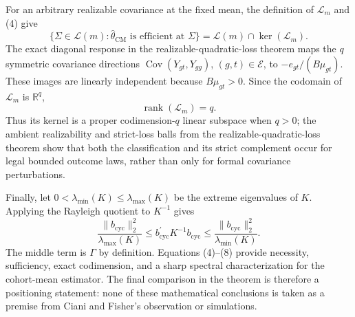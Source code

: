 For an arbitrary realizable covariance at the fixed mean, the definition of \(\mathcal L_m\) and (4) give
\[
\{\Sigma\in\mathcal L(m):\widehat\theta_{\mathrm{CM}}
\text{ is efficient at }\Sigma\}
=\mathcal L(m)\cap\ker(\mathcal L_m).                 \tag{6}
\]
The exact diagonal response in the realizable-quadratic-loss theorem maps the \(q\) symmetric covariance directions
\(\operatorname{Cov}(Y_{gt},Y_{gg})\), \((g,t)\in\mathcal E\), to
\(-e_{gt}/(B\mu_{gt})\).  These images are linearly independent because \(B\mu_{gt}>0\).  Since the codomain of \(\mathcal L_m\) is \(\mathbb R^q\),
\[
\operatorname{rank}(\mathcal L_m)=q.                  \tag{7}
\]
Thus its kernel is a proper codimension-\(q\) linear subspace when \(q>0\); the ambient realizability and strict-loss balls from the realizable-quadratic-loss theorem show that both the classification and its strict complement occur for legal bounded outcome laws, rather than only for formal covariance perturbations.

Finally, let \(0<\lambda_{\min}(K)\le\lambda_{\max}(K)\) be the extreme eigenvalues of \(K\).  Applying the Rayleigh quotient to \(K^{-1}\) gives
\[
\frac{\|b_{\mathrm{cyc}}\|_2^2}{\lambda_{\max}(K)}
\le
b_{\mathrm{cyc}}^{\prime}K^{-1}b_{\mathrm{cyc}}
\le
\frac{\|b_{\mathrm{cyc}}\|_2^2}{\lambda_{\min}(K)}. \tag{8}
\]
The middle term is \(\Gamma\) by definition.  Equations (4)--(8) provide necessity, sufficiency, exact codimension, and a sharp spectral characterization for the cohort-mean estimator.  The final comparison in the theorem is therefore a positioning statement: none of these mathematical conclusions is taken as a premise from Ciani and Fisher's observation or simulations.
